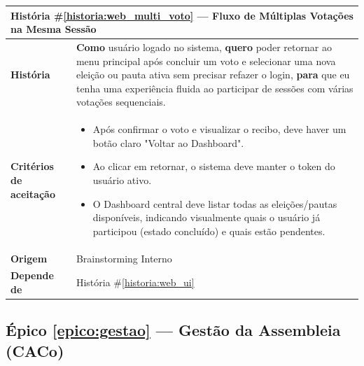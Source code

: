 \documentclass[12pt,a4paper]{article}
\newcounter{epico}
\newcounter{historia}
\begin{document}
\label{historia:web_multi_voto}
\begin{table}[H]
    \centering
    \begin{tabular}{|m{4.5cm} | m{11cm}|}
    \hline
    \multicolumn{2}{|l|}{\textbf{História \#\ref{historia:web_multi_voto} --- Fluxo de Múltiplas Votações na Mesma Sessão}} \\
    \hline  \textbf{História} &
    \textbf{Como} usuário logado no sistema, \newline
    \textbf{quero} poder retornar ao menu principal após concluir um voto e selecionar uma nova eleição ou pauta ativa sem precisar refazer o login,\newline  
    \textbf{para} que eu tenha uma experiência fluida ao participar de sessões com várias votações sequenciais. \\
    \textbf{Critérios de aceitação} &
    \begin{itemize}
        \item{Após confirmar o voto e visualizar o recibo, deve haver um botão claro "Voltar ao Dashboard".}
        \item{Ao clicar em retornar, o sistema deve manter o token do usuário ativo.}
        \item{O Dashboard central deve listar todas as eleições/pautas disponíveis, indicando visualmente quais o usuário já participou (estado concluído) e quais estão pendentes.}
    \end{itemize}\\
    \textbf{Origem}& Brainstorming Interno\\
    \textbf{Depende de}& História \#\ref{historia:web_ui} \\
    \hline
    \end{tabular}
\end{table}

\label{epico:gestao}
\subsection*{Épico \ref{epico:gestao} --- Gestão da Assembleia (CACo)}
\end{document}
